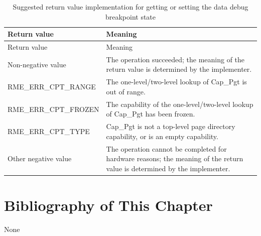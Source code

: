 \begin{xltabular}{\textwidth}{@{}>{\hsize\raggedright\arraybackslash}X>{\hsize\raggedright\arraybackslash}X@{}}
\caption{Suggested return value implementation for getting or setting the data debug breakpoint state}\label{tab:8-122-get-or-set-data-breakpoint-state-suggested-return-values}\\
\toprule
Return value & Meaning\tabularnewline
\endfirsthead
\toprule
Return value & Meaning\tabularnewline
\midrule
\endhead
\bottomrule
\endlastfoot
    Non-negative value & The operation succeeded; the meaning of the return value is determined by the implementer.\tabularnewline
    RME\_ERR\_CPT\_RANGE & The one-level/two-level lookup of Cap\_Pgt is out of range.\tabularnewline
    RME\_ERR\_CPT\_FROZEN & The capability of the one-level/two-level lookup of Cap\_Pgt has been frozen.\tabularnewline
    RME\_ERR\_CPT\_TYPE & Cap\_Pgt is not a top-level page directory capability, or is an empty capability.\tabularnewline
    Other negative value & The operation cannot be completed for hardware reasons; the meaning of the return value is determined by the implementer.\tabularnewline
\end{xltabular}
\nopagebreak[4]

\section{Bibliography of This Chapter}\label{sec:8-chapter-bibliography}

None
